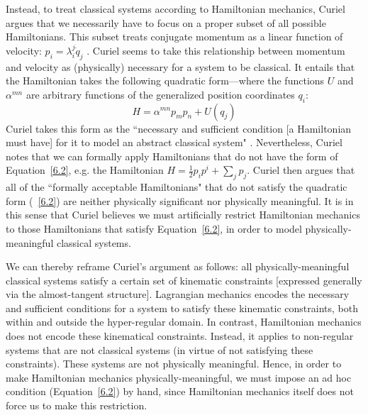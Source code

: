 \documentclass[letterpaper]{article}
\begin{document}
Instead, to treat classical systems according to Hamiltonian mechanics, Curiel argues that we necessarily have to focus on a proper subset of all possible Hamiltonians. This subset treats conjugate momentum as a linear function of velocity: $p_i = \lambda^j_i \dot{q}_j $ \parencites*[304]{Curiel}. Curiel seems to take this relationship between momentum and velocity as (physically) necessary for a system to be classical. It entails that the Hamiltonian takes the following quadratic form---where the functions $U$ and $\alpha^{m n}$ are arbitrary functions of the generalized position coordinates $q_i$:
\begin{equation} \label{6.2}
H =\alpha^{m n} p_m p_n + U (q_j) 
\end{equation}
Curiel takes this form as the ``necessary and sufficient condition [a Hamiltonian must have] for it to model an abstract classical system" \parencites*[305]{Curiel}. Nevertheless, Curiel notes that we can formally apply Hamiltonians that do not have the form of Equation~\ref{6.2}, e.g. the Hamiltonian $H = \frac{1}{2} p_i p^i + \sum_j p_j$. Curiel then argues that all of the ``formally acceptable Hamiltonians" that do not satisfy the quadratic form (~\ref{6.2}) are neither physically significant nor physically meaningful. It is in this sense that Curiel believes we must artificially restrict Hamiltonian mechanics to those Hamiltonians that satisfy Equation~\ref{6.2}, in order to model physically-meaningful classical systems.

We can thereby reframe Curiel's argument as follows: all physically-meaningful classical systems satisfy a certain set of kinematic constraints [expressed generally via the almost-tangent structure]. Lagrangian mechanics encodes the necessary and sufficient conditions for a system to satisfy these kinematic constraints, both within and outside the hyper-regular domain. In contrast, Hamiltonian mechanics does not encode these kinematical constraints. Instead, it applies to non-regular systems that are not classical systems (in virtue of not satisfying these constraints). These systems are not physically meaningful. Hence, in order to make Hamiltonian mechanics physically-meaningful, we must impose an ad hoc condition (Equation~\ref{6.2}) by hand, since Hamiltonian mechanics itself does not force us to make this restriction. 
\end{document}
